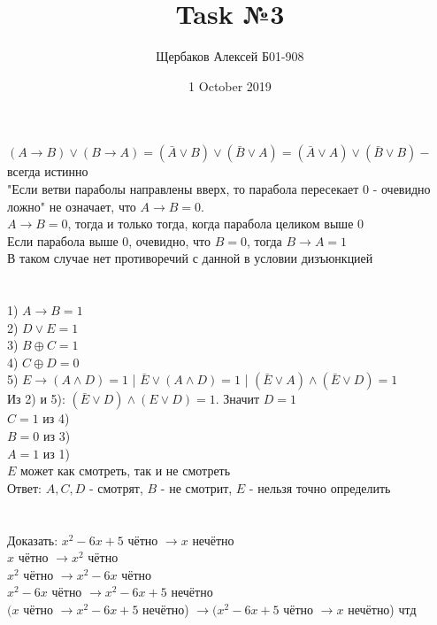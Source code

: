 \documentclass{article}
\title{Task №3}
\author{Щербаков Алексей Б01-908}
\date{1 October 2019}
\begin{document}
\maketitle
\section{}
$(A \rightarrow B) \vee (B \rightarrow A) = (\bar A \vee B) \vee (\bar B \vee A) = (\bar A \vee A) \vee (\bar B \vee B) -$ всегда истинно
\\ "Если ветви параболы направлены вверх, то парабола пересекает 0 - очевидно ложно" не означает, что $A \rightarrow B = 0$.\\
$A \rightarrow B = 0$, тогда и только тогда, когда парабола целиком выше 0\\
Если парабола выше 0, очевидно, что $B = 0$, тогда $B \rightarrow A = 1$\\ В таком случае нет противоречий с данной в условии дизъюнкцией
\section{}
1) $A \rightarrow B = 1$\\
2) $D \vee E = 1$\\
3) $B \oplus C = 1$\\
4) $C \oplus D = 0$\\
5) $E \rightarrow (A \wedge D) = 1$ | $\bar E \vee (A \wedge D) = 1$ | $(\bar E \vee A) \wedge (\bar E \vee D) = 1$\\
Из 2) и 5): $(\bar E \vee D) \wedge (E \vee D) = 1$. Значит $D = 1$\\
$C = 1$ из 4)\\
$B = 0$ из 3)\\
$A = 1$ из 1)\\
$E$ может как смотреть, так и не смотреть\\
Ответ: $A, C, D$ - смотрят, $B$ - не смотрит, $E$ - нельзя точно определить
\section{}
Доказать: $x^2 - 6x + 5$ чётно $\rightarrow x$ нечётно\\
$x$ чётно $\rightarrow x^2$ чётно\\
$x^2$ чётно $\rightarrow x^2 - 6x$ чётно\\
$x^2 - 6x$ чётно $\rightarrow x^2 - 6x + 5$ нечётно\\
$(x$ чётно $\rightarrow x^2 - 6x + 5$ нечётно) $\rightarrow (x^2 - 6x + 5$ чётно $\rightarrow x$ нечётно) чтд\\
\end{document}
